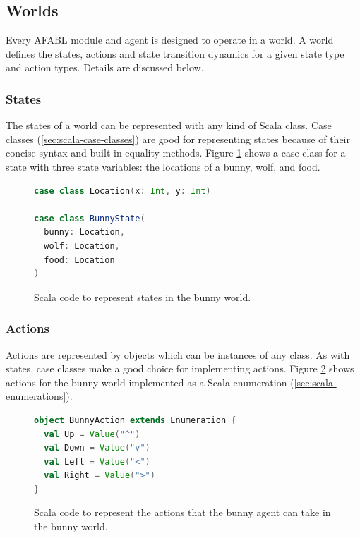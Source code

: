 \subsection{Worlds}

Every AFABL module and agent is designed to operate in a world. A world defines the states, actions and state transition dynamics for a given state type and action types. Details are discussed below.

\subsubsection{States}

The states of a world can be represented with any kind of Scala class. Case classes (\ref{sec:scala-case-classes}) are good for representing states because of their concise syntax and built-in equality methods. Figure \ref{fig:bunny-state-code} shows a case class for a state with three state variables: the locations of a bunny, wolf, and food.

\begin{figure}[!h]
\begin{center}

\begin{lstlisting}[language=Scala]
case class Location(x: Int, y: Int)

case class BunnyState(
  bunny: Location,
  wolf: Location,
  food: Location
)
\end{lstlisting}

\caption{Scala code to represent states in the bunny world.}
\end{center}
\label{fig:bunny-state-code}
\end{figure}

\subsubsection{Actions}

Actions are represented by objects which can be instances of any class. As with states, case classes make a good choice for implementing actions. Figure \ref{fig:bunny-action-code} shows actions for the bunny world implemented as a Scala enumeration (\ref{sec:scala-enumerations}).

\begin{figure}[!h]
\begin{center}

\begin{lstlisting}[language=Scala]
object BunnyAction extends Enumeration {
  val Up = Value("^")
  val Down = Value("v")
  val Left = Value("<")
  val Right = Value(">")
}
\end{lstlisting}

\caption{Scala code to represent the actions that the bunny agent can take in the bunny world.}
\end{center}
\label{fig:bunny-action-code}
\end{figure}

